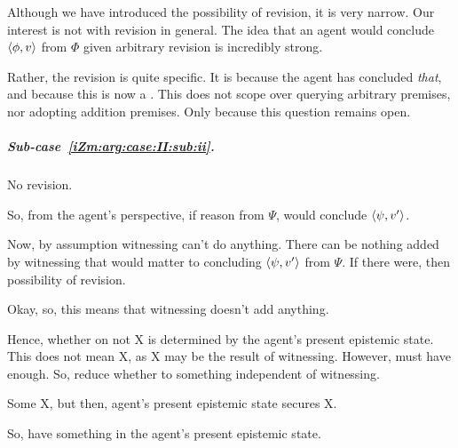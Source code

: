 \begin{note}
  Although we have introduced the possibility of revision, it is very narrow.
  Our interest is not with revision in general.
  The idea that an agent would conclude \(\langle \phi, v \rangle\) from \(\Phi\) given arbitrary revision is incredibly strong.

  Rather, the revision is quite specific.
  It is because the agent has concluded \emph{that}, and because this is now a \requ{}.
  This does not scope over querying arbitrary premises, nor adopting addition premises.
  Only because this question remains open.
\end{note}


\subparagraph*{Sub-case~\ref{iZm:arg:case:II:sub:ii}.}

\begin{note}
  No revision.

  So, from the agent's perspective, if reason from \(\Psi\), would conclude \(\langle \psi, v' \rangle\).
\end{note}

\begin{note}
  Now, by assumption witnessing can't do anything.
  There can be nothing added by witnessing that would matter to concluding \(\langle \psi, v' \rangle\) from \(\Psi\).
  If there were, then possibility of revision.

  Okay, so, this means that witnessing doesn't add anything.

  Hence, whether on not X is determined by the agent's present epistemic state.
  This does not mean X, as X may be the result of witnessing.
  However, must have enough.
  So, reduce whether to something independent of witnessing.




  Some X, but then, agent's present epistemic state secures X.







  So, have something in the agent's present epistemic state.
  
\end{note}

